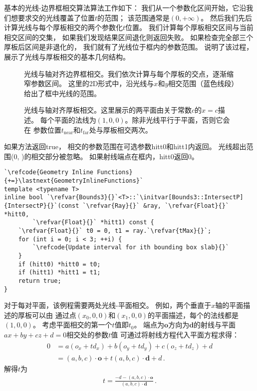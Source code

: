 基本的光线-边界框相交算法算法工作如下：
我们从一个参数化区间开始，它沿我们想要求交的光线覆盖了位置$t$的范围；
该范围通常是$(0,+\infty)$。
然后我们先后计算光线与每个厚板相交的两个参数化$t$位置。
我们计算每个厚板相交区间与当前相交区间的交集，
如果我们发现结果区间退化则返回失败。
如果检查完全部三个厚板后区间是非退化的，
我们就有了光线位于框内的参数范围。
说明了该过程，
展示了光线与厚板相交的基本几何结构。
\begin{figure}[htb]
    \centering
    \caption{光线与轴对齐边界框相交。我们依次计算与每个厚板的交点，逐渐缩窄参数区间。
        这里的2D形式中，沿光线与$x$和$y$相交范围（蓝色线段）给出了框中光线的范围。}
    \label{fig:3.2}
\end{figure}
\begin{figure}[htb]
    \centering
    \caption{光线与轴对齐厚板相交。这里展示的两平面由关于常数$c$的$x=c$描述。
        每个平面的法线为$(1,0,0)$。除非光线平行于平面，否则它会在
        参数位置$t_{\mathrm{near}}$和$t_{\mathrm{far}}$处与厚板相交两次。}
    \label{fig:3.3}
\end{figure}

如果方法返回{\ttfamily true}，
相交的参数范围在可选参数{\ttfamily hitt0}和{\ttfamily hitt1}内返回。
光线超出范围{\ttfamily (0, )}的相交部分被忽略。
如果射线端点在框内，{\ttfamily hitt0}返回$0$。
\begin{lstlisting}
`\refcode{Geometry Inline Functions}{+=}\lastnext{GeometryInlineFunctions}`
template <typename T>
inline bool `\refvar{Bounds3}{}`<T>::`\initvar[Bounds3::IntersectP]{IntersectP}{}`(const `\refvar{Ray}{}` &ray, `\refvar{Float}{}` *hitt0,
        `\refvar{Float}{}` *hitt1) const {
    `\refvar{Float}{}` t0 = 0, t1 = ray.`\refvar{tMax}{}`;
    for (int i = 0; i < 3; ++i) {
        `\refcode{Update interval for ith bounding box slab}{}`
    }
    if (hitt0) *hitt0 = t0;
    if (hitt1) *hitt1 = t1;
    return true;
}
\end{lstlisting}

对于每对平面，该例程需要两处光线-平面相交。
例如，两个垂直于$x$轴的平面描述的厚板可以由
通过点$(x_0,0,0)$和$(x_1,0,0)$的平面描述，每个的法线都是$(1,0,0)$。
考虑平面相交的第一个$t$值即$t_0$。
端点为$\bm o$方向为$\bm d$的射线与平面$ax+by+cz+d=0$相交处的参数$t$值
可通过将射线方程代入平面方程求得：
\begin{align*}
    0 & =a(o_x+td_x)+b(o_y+td_y)+c(o_z+td_z)+d      \\
      & =(a,b,c)\cdot\bm o+t(a,b,c)\cdot\bm d+d\, .
\end{align*}
解得$t$为
\begin{align*}
    t=\frac{-d-(a,b,c)\cdot\bm o}{(a,b,c)\cdot\bm d}\, .
\end{align*}

